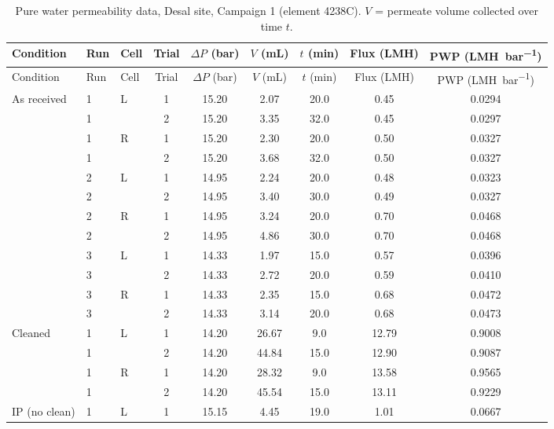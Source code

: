 {\footnotesize\setlength{\tabcolsep}{4pt}
\begin{longtable}{lllcccccc}
  \caption{Pure water permeability data, Desal site, Campaign 1 (element 4238C). $V$ = permeate volume collected over time $t$.}
  \label{tab:app-c1-4238C-pwp}\\
  \toprule
  Condition & Run & Cell & Trial & $\Delta P$ (\unit{bar}) & $V$ (\unit{mL}) & $t$ (\unit{min}) & Flux (\unit{LMH}) & PWP (\unit{LMH.bar^{-1}}) \\
  \midrule
  \endfirsthead
  \toprule
  Condition & Run & Cell & Trial & $\Delta P$ (\unit{bar}) & $V$ (\unit{mL}) & $t$ (\unit{min}) & Flux (\unit{LMH}) & PWP (\unit{LMH.bar^{-1}}) \\
  \midrule
  \endhead
    As received & 1 & L & 1 & 15.20 & 2.07 & 20.0 & 0.45 & 0.0294 \\
     & 1 &  & 2 & 15.20 & 3.35 & 32.0 & 0.45 & 0.0297 \\
    \addlinespace[2pt]
     & 1 & R & 1 & 15.20 & 2.30 & 20.0 & 0.50 & 0.0327 \\
     & 1 &  & 2 & 15.20 & 3.68 & 32.0 & 0.50 & 0.0327 \\
    \addlinespace[2pt]
     & 2 & L & 1 & 14.95 & 2.24 & 20.0 & 0.48 & 0.0323 \\
     & 2 &  & 2 & 14.95 & 3.40 & 30.0 & 0.49 & 0.0327 \\
    \addlinespace[2pt]
     & 2 & R & 1 & 14.95 & 3.24 & 20.0 & 0.70 & 0.0468 \\
     & 2 &  & 2 & 14.95 & 4.86 & 30.0 & 0.70 & 0.0468 \\
    \addlinespace[2pt]
     & 3 & L & 1 & 14.33 & 1.97 & 15.0 & 0.57 & 0.0396 \\
     & 3 &  & 2 & 14.33 & 2.72 & 20.0 & 0.59 & 0.0410 \\
    \addlinespace[2pt]
     & 3 & R & 1 & 14.33 & 2.35 & 15.0 & 0.68 & 0.0472 \\
     & 3 &  & 2 & 14.33 & 3.14 & 20.0 & 0.68 & 0.0473 \\
    \midrule
    Cleaned & 1 & L & 1 & 14.20 & 26.67 & 9.0 & 12.79 & 0.9008 \\
     & 1 &  & 2 & 14.20 & 44.84 & 15.0 & 12.90 & 0.9087 \\
    \addlinespace[2pt]
     & 1 & R & 1 & 14.20 & 28.32 & 9.0 & 13.58 & 0.9565 \\
     & 1 &  & 2 & 14.20 & 45.54 & 15.0 & 13.11 & 0.9229 \\
    \midrule
    IP (no clean) & 1 & L & 1 & 15.15 & 4.45 & 19.0 & 1.01 & 0.0667 \\

\end{longtable}}

